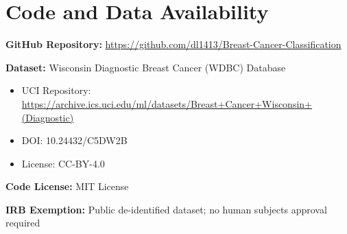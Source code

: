 \documentclass[11pt,a4paper]{article}
\begin{document}
\section*{Code and Data Availability}

\textbf{GitHub Repository:} \url{https://github.com/dl1413/Breast-Cancer-Classification}

\textbf{Dataset:} Wisconsin Diagnostic Breast Cancer (WDBC) Database
\begin{itemize}
    \item UCI Repository: \url{https://archive.ics.uci.edu/ml/datasets/Breast+Cancer+Wisconsin+(Diagnostic)}
    \item DOI: 10.24432/C5DW2B
    \item License: CC-BY-4.0
\end{itemize}

\textbf{Code License:} MIT License

\textbf{IRB Exemption:} Public de-identified dataset; no human subjects approval required
\end{document}
